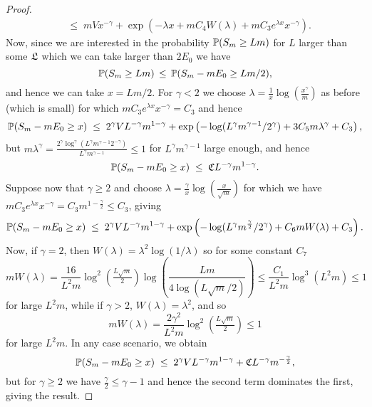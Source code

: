 \begin{proof}
\begin{align*}
&\leq\;mVx^{-\gamma}+\exp\left(-\lambda x+mC_4W(\lambda)+ mC_3e^{\lambda x}x^{-\gamma}\right).
\end{align*}
Now, since we are interested in the probability $\mathbb{P}(S_m\geq Lm)$ for $L$ larger than some $\mathfrak{L}$ which we can take larger than $2E_0$ we have
\[\mathbb{P}(S_m\geq Lm)\,\leq\,\mathbb{P}(S_m-mE_0\geq Lm/2),\]
and hence we can take $x=Lm/2$. For $\gamma<2$ we choose $\lambda=\frac{1}{x}\log(\frac{x^\gamma}{m})$ as before (which is small) for which $mC_3e^{\lambda x}x^{-\gamma}=C_3$ and hence
\[\mathbb{P}(S_m-mE_0\geq x)\;\leq\;2^\gamma VL^{-\gamma}m^{1-\gamma}+\exp\left(-\log(L^\gamma m^{\gamma-1}/2^{\gamma})+3C_5m\lambda^\gamma+ C_3\right),  \]
but $m\lambda^\gamma=\frac{2^\gamma\log^\gamma(L^\gamma m^{\gamma-1}2^{-\gamma})}{L^\gamma m^{\gamma-1}}\leq 1$ for $L^\gamma m^{\gamma-1}$ large enough, and hence
\[\mathbb{P}(S_m-mE_0\geq x)\;\leq\;\mathfrak{C} L^{-\gamma}m^{1-\gamma}.\]
Suppose now that $\gamma\geq 2$ and choose $\lambda=\frac{\gamma}{x}\log(\frac{x}{\sqrt{m}})$ for which we have $mC_3e^{\lambda x}x^{-\gamma}=C_3m^{1-\frac{\gamma}{2}}\leq C_3$, giving 
\[\mathbb{P}(S_m-mE_0\geq x)\;\leq\;2^\gamma VL^{-\gamma}m^{1-\gamma}+\exp\left(-\log(L^\gamma m^{\frac{\gamma}{2}}/2^{\gamma})+C_6mW(\lambda)+ C_3\right).\]
Now, if $\gamma=2$, then $W(\lambda)=\lambda^2\log(1/\lambda)$ so for some constant $C_7$
\[mW(\lambda)=\frac{16}{L^2m}\log^2(\tfrac{L \sqrt{m}}{2})\log\left(\frac{Lm}{4\log(L\sqrt{m}/2)}\right)\leq\frac{C_1}{L^2m}\log^3(L^2m)\leq 1\]
for large $L^2m$, while if $\gamma>2$, $W(\lambda)=\lambda^2$, and so 
\[mW(\lambda)=\frac{2\gamma^2}{L^2m}\log^2(\tfrac{L \sqrt{m}}{2})\leq 1\]
for large $L^2m$. In any case scenario, we obtain
\[\mathbb{P}(S_m-mE_0\geq x)\;\leq\;2^\gamma VL^{-\gamma}m^{1-\gamma}+\mathfrak{C} L^{-\gamma}m^{-\frac{\gamma}{2}},\]
but for $\gamma\geq 2$ we have $\frac{\gamma}{2}\leq\gamma-1$ and hence the second term dominates the first, giving the result.
\end{proof}